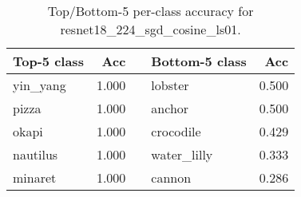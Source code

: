 \begin{table}[h]
  \centering
  \begin{tabular}{l r c l r}
    \toprule
    \textbf{Top-5 class} & \textbf{Acc} & & \textbf{Bottom-5 class} & \textbf{Acc}\\
    \midrule
    yin_yang & 1.000 & & lobster & 0.500\\
    pizza & 1.000 & & anchor & 0.500\\
    okapi & 1.000 & & crocodile & 0.429\\
    nautilus & 1.000 & & water_lilly & 0.333\\
    minaret & 1.000 & & cannon & 0.286\\
    \bottomrule
  \end{tabular}
  \caption{Top/Bottom-5 per-class accuracy for resnet18_224_sgd_cosine_ls01.}
  \label{tab:perclass_resnet18_224_sgd_cosine_ls01}
\end{table}